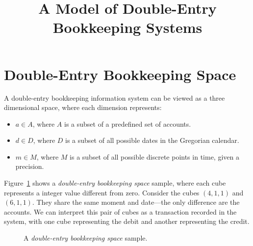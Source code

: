 \documentclass{article}
\begin{document}
\title{A Model of Double-Entry Bookkeeping Systems}
\author{}
\date{}
\maketitle

\section{Double-Entry Bookkeeping Space}

A double-entry bookkeeping information system can be viewed as a three dimensional space,
where each dimension represents:

\begin{itemize}
	\item $a \in A$, where $A$ is a subset of a predefined set of accounts.
	\item $d \in D$, where $D$ is a subset of all possible dates
		in the Gregorian calendar.
	\item $m \in M$, where $M$ is a subset of all possible discrete points in time, given a precision.
\end{itemize}

Figure~\ref{fig:deb-space-sample} shows a \emph{double-entry bookkeeping space} sample, 
where each cube represents a integer value different from zero.
Consider the cubes $(4,1,1)$ and $(6,1,1)$. They share the same moment 
and date---the only difference are the accounts. 
We can interpret this pair of cubes as a transaction recorded in the system,
with one cube representing the debit and another representing the credit.

\begin{figure}[h]
\centering
{}
\label{fig:deb-space-sample}
\caption{A \emph{double-entry bookkeeping space} sample.}
\end{figure}
\end{document}
